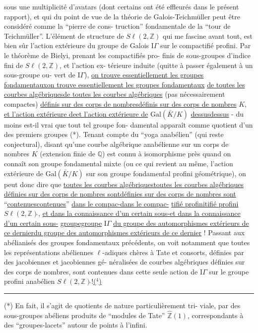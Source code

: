 \documentclass[11pt,a4paper]{article}
\newif\ifenglish
\let\TextUline\uline
\renewcommand{\uline}[1]{\ifmmode\underline{#1}\else\TextUline{#1}\fi}
\newcommand{\margin}[1]{%
  \sbox{\MarginalTestBox}{\parbox{\marginparwidth}{\raggedright\footnotesize#1}}%
  \ifdim\dimexpr\ht\MarginalTestBox+\dp\MarginalTestBox\relax>3\baselineskip
    \par\smallskip\noindent\begin{minipage}{\linewidth}\hrule\smallskip
    {\footnotesize\textcolor{HandInk}{\ifenglish Marginal note:\else Note marginale :\fi\ #1}}\smallskip\hrule\end{minipage}\par\smallskip
  \else
    \marginnote{\raggedright\footnotesize\textcolor{HandInk}{#1}}%
  \fi}
\newcommand{\notecall}[3]{\hypertarget{#2}{\hyperlink{note-#1}{#3}}}
\begin{document}
sous une multiplicité d'avatars (dont certains ont été effleurés
dans le présent rapport), et qui du point de vue de la théorie de
Galois-Teichmüller peut être considéré comme la ``pierre de cons-%
truction'' fondamentale de la ``tour de Teichmüller''. L'élément de
structure de $S\ell(2,\mathbb{Z})$ qui me fascine avant tout, est bien sûr
l'action extérieure du groupe de Galois $\mathrm{I}\!\Gamma$ sur le compactifié
profini. Par le théorème de Bielyi, prenant les compactifiés pro-%
finis de sous-groupes d'indice fini de $S\ell(2,\mathbb{Z})$, et l'action ex-%
térieure induite (quitte à passer également à un sous-groupe ou-%
vert de $\mathrm{I}\!\Gamma$), \uline{on trouve essentiellement les groupes fondamentaux}
\uline{de toutes les courbes algébriques} (pas nécessairement compactes)
\uline{définis sur des corps de nombres} $K$, \uline{et l'action extérieure de}
$\mathrm{Gal}(\bar{K}/K)$ \uline{dessus} - du moins est-il vrai que tout tel groupe fon-%
damental apparaît comme quotient d'un des premiers groupes (*).
Tenant compte du ``yoga anabélien'' (qui reste conjectural), disant
qu'une courbe algébrique anabélienne sur un corps de nombres $K$
(extension finie de $\mathbb{Q}$) est connu à isomorphisme près quand on
connaît son groupe fondamental mixte (ou ce qui revient au même,
l'action extérieure de $\mathrm{Gal}(\bar{K}/K)$ sur son groupe fondamental profini
géométrique), on peut donc dire que \uline{toutes les courbes algébriques}
\uline{définies sur des corps de nombres sont} ``\uline{contenues}'' \uline{dans le compac-}%
\uline{tifié profini} $S\ell(2,\mathbb{Z})\hat{}$, \uline{et dans la connaissance d'un certain sous-}%
\uline{groupe} $\mathrm{I}\!\Gamma$ \uline{du groupe des automorphismes extérieurs de ce dernier} !
Passant aux abélianisés des groupes fondamentaux précédents, on voit
notamment que toutes les représentations abéliennes $\ell$-adiques chères
à Tate et consorts, définies par des jacobiennes et jacobiennes gé-%
néralisées de courbes algébriques définies sur des corps de nombres,
sont contenues dans cette seule action de $\mathrm{I}\!\Gamma$ sur le groupe profini
anabélien $S\ell(2,\mathbb{Z})\hat{}$!\notecall{copy1-4}{call-esq_119_019-4-1}{($^{4}$)}

\rule{5cm}{0.4pt}

(*) En fait, il s'agit de quotients de nature particulièrement tri-%
viale, par des sous-groupes abéliens produits de ``modules de Tate''
$\hat{\mathbb{Z}}(1)$, correspondants à des ``groupes-lacets'' autour de points à l'infini.

\margin{19}
\end{document}
